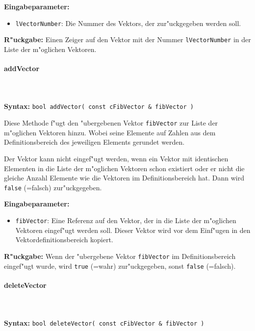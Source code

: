 \bigskip\noindent
\textbf{Eingabeparameter:}
\begin{itemize}
 \item \verb|lVectorNumber|: Die Nummer des Vektors, der zur"uckgegeben werden soll.
\end{itemize}

\bigskip\noindent
\textbf{R"uckgabe:} Einen Zeiger auf den Vektor mit der Nummer \verb|lVectorNumber| in der Liste der m"oglichen Vektoren.


\paragraph{addVector}

\ \\\\\noindent
\textbf{Syntax:} \verb|bool addVector( const cFibVector & fibVector )|

\bigskip\noindent
Diese Methode f"ugt den "ubergebenen Vektor \verb|fibVector| zur Liste der m"oglichen Vektoren hinzu. Wobei seine Elemente auf Zahlen aus dem Definitionsbereich des jeweiligen Elements gerundet werden.

Der Vektor kann nicht eingef"ugt werden, wenn ein Vektor mit identischen Elementen in die Liste der m"oglichen Vektoren schon existiert oder er nicht die gleiche Anzahl Elemente wie die Vektoren im Definitionsbereich hat. Dann wird \verb|false| (=falsch) zur"uckgegeben.

\bigskip\noindent
\textbf{Eingabeparameter:}
\begin{itemize}
 \item \verb|fibVector|: Eine Referenz auf den Vektor, der in die Liste der m"oglichen Vektoren eingef"ugt werden soll. Dieser Vektor wird vor dem Einf"ugen in den Vektordefinitionsbereich kopiert.
\end{itemize}

\bigskip\noindent
\textbf{R"uckgabe:}  Wenn der "ubergebene Vektor \verb|fibVector| im Definitionsbereich eingef"ugt wurde, wird \verb|true| (=wahr) zur"uckgegeben, sonst \verb|false| (=falsch).


\paragraph{deleteVector}

\ \\\\\noindent
\textbf{Syntax:} \verb|bool deleteVector( const cFibVector & fibVector )|

